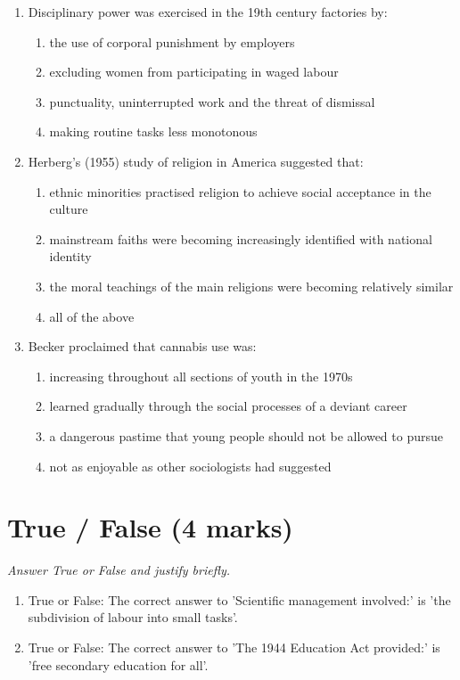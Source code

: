 \documentclass[12pt]{article}
\begin{document}
\begin{enumerate}[label=\arabic*.]
\begin{enumerate}[label=(\alph*)]
\end{enumerate}
\item Disciplinary power was exercised in the 19th century factories by:
\begin{enumerate}[label=(\alph*)]
    \item the use of corporal punishment by employers
    \item excluding women from participating in waged labour
    \item punctuality, uninterrupted work and the threat of dismissal
    \item making routine tasks less monotonous
\end{enumerate}
\item Herberg's (1955) study of religion in America suggested that:
\begin{enumerate}[label=(\alph*)]
    \item ethnic minorities practised religion to achieve social acceptance in the culture
    \item mainstream faiths were becoming increasingly identified with national identity
    \item the moral teachings of the main religions were becoming relatively similar
    \item all of the above
\end{enumerate}
\item Becker proclaimed that cannabis use was:
\begin{enumerate}[label=(\alph*)]
    \item increasing throughout all sections of youth in the 1970s
    \item learned gradually through the social processes of a deviant career
    \item a dangerous pastime that young people should not be allowed to pursue
    \item not as enjoyable as other sociologists had suggested
\end{enumerate}
\end{enumerate}

\section*{True / False (4 marks)}
\textit{Answer True or False and justify briefly.}
\begin{enumerate}[label=\arabic*.]
\item True or False: The correct answer to 'Scientific management involved:' is 'the subdivision of labour into small tasks'.
\item True or False: The correct answer to 'The 1944 Education Act provided:' is 'free secondary education for all'.
\end{enumerate}
\end{document}
